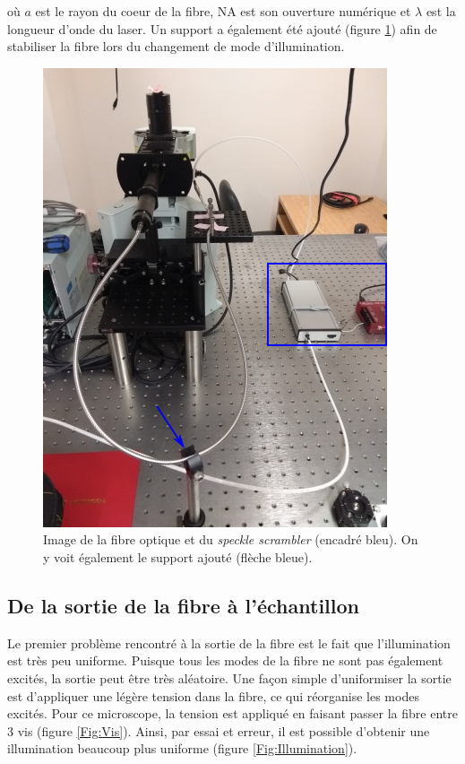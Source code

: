 \documentclass{article}       %
\begin{document}
où $a$ est le rayon du coeur de la fibre, NA est son ouverture numérique et $\lambda$ est la longueur d'onde du laser. Un support a également été ajouté (figure \ref{Fig:Scrambler}) afin de stabiliser la fibre lors du changement de mode d'illumination.

\begin{figure}[H]
    \centering
    \includegraphics[scale=0.75]{fig/SpeckleScrambler.PNG}
    \caption{Image de la fibre optique et du \textit{speckle scrambler} (encadré bleu). On y voit également le support ajouté (flèche bleue).}
    \label{Fig:Scrambler}
\end{figure}

\subsection{De la sortie de la fibre à l'échantillon}

Le premier problème rencontré à la sortie de la fibre est le fait que l'illumination est très peu uniforme. Puisque tous les modes de la fibre ne sont pas également excités, la sortie peut être très aléatoire. Une façon simple d'uniformiser la sortie est d'appliquer une légère tension dans la fibre, ce qui réorganise les modes excités. Pour ce microscope, la tension est appliqué en faisant passer la fibre entre 3 vis (figure \ref{Fig:Vis}). Ainsi, par essai et erreur, il est possible d'obtenir une illumination beaucoup plus uniforme (figure \ref{Fig:Illumination}).
\end{document}
